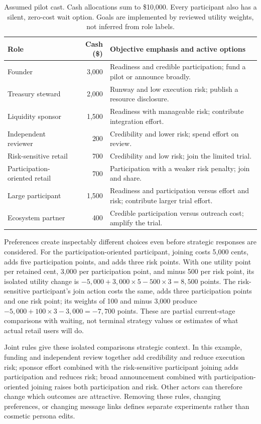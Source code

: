 \begin{table}[t]
\caption{Assumed pilot cast. Cash allocations sum to \$10,000. Every participant
also has a silent, zero-cost wait option. Goals are implemented by reviewed
utility weights, not inferred from role labels.}
\label{tab:cast}
\centering\footnotesize
\begin{tabularx}{\columnwidth}{@{}p{}rY@{}}
\toprule Role & Cash (\$) & Objective emphasis and active options \\
\midrule
Founder & 3,000 & Readiness and credible participation; fund a pilot or announce broadly. \\
Treasury steward & 2,000 & Runway and low execution risk; publish a resource disclosure. \\
Liquidity sponsor & 1,500 & Readiness with manageable risk; contribute integration effort. \\
Independent reviewer & 200 & Credibility and lower risk; spend effort on review. \\
Risk-sensitive retail & 700 & Credibility and low risk; join the limited trial. \\
Participation-oriented retail & 700 & Participation with a weaker risk penalty; join and share. \\
Large participant & 1,500 & Readiness and participation versus effort and risk; contribute larger trial effort. \\
Ecosystem partner & 400 & Credible participation versus outreach cost; amplify the trial. \\
\bottomrule
\end{tabularx}
\end{table}

Preferences create inspectably different choices even before strategic
responses are considered. For the participation-oriented participant, joining
costs 5,000 cents, adds five participation points, and adds three risk points.
With one utility point per retained cent, 3,000 per participation point, and
minus 500 per risk point, its isolated utility change is
$-5{,}000+3{,}000\times5-500\times3=8{,}500$ points.
The risk-sensitive participant's join action costs the same, adds three
participation points and one risk point; its weights of 100 and minus 3,000
produce $-5{,}000+100\times3-3{,}000=-7{,}700$ points.
These are partial current-stage comparisons with waiting, not terminal
strategy values or estimates of what actual retail users will do.

Joint rules give these isolated comparisons strategic context. In this example,
funding and independent review together add credibility and reduce execution
risk; sponsor effort combined with the risk-sensitive participant joining
adds participation and reduces risk; broad announcement combined with
participation-oriented joining raises both participation and risk. Other
actors can therefore change which outcomes are attractive. Removing these
rules, changing preferences, or changing message links defines separate
experiments rather than cosmetic persona edits.

